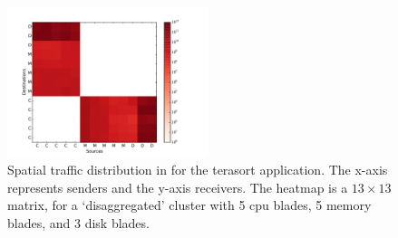 \begin{figure}[t]
  \centering
    \includegraphics[width = 2.3in]{img/graph6_trafficvolumeheatmap_dis_terasort} 
  
  \caption{\small{Spatial traffic distribution in \dis for the terasort application. The x-axis represents senders and the y-axis receivers. The heatmap is a $13 \times 13$ matrix, for a `disaggregated' cluster with 5 cpu blades, 5 memory blades, and 3 disk blades.}}
  
  \label{fig:sd}
\end{figure}



